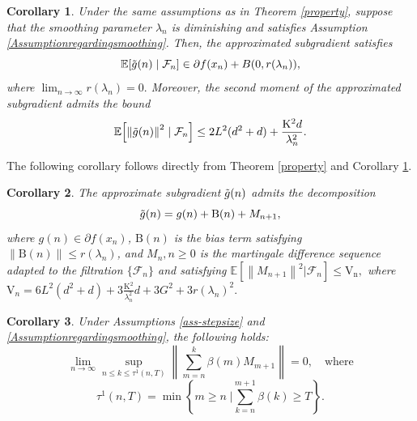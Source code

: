 \documentclass[9pt,journal,twoside,web]{ieeecolor}
\newtheorem{Corollary}{Corollary}
\newcommand{\norm}[1]{\left\lVert #1 \right\rVert}
\begin{document}
\begin{Corollary}
Under the same assumptions as in Theorem \ref{property}, suppose that the smoothing parameter $\lambda_n$ is diminishing and satisfies Assumption \ref{Assumptionregardingsmoothing}. Then, the approximated subgradient satisfies
\begin{equation}
    \mathbb{E}[\Tilde{g}(n)\mid \mathcal{F}_n]
    \in \partial f(x_n) + B(0,r(\lambda_n)),
    \label{expectationc}
\end{equation}
where $\lim_{n\to\infty} r(\lambda_n)=0.$
Moreover, the second moment of the approximated subgradient admits the bound
\begin{equation}
    \mathbb{E}\!\left[\norm{\Tilde{g}(n)}^2 \mid \mathcal{F}_n \right]
    \leq
    2L^2(d^2+d)
    +
    \frac{\mathrm{K}^2 d}{\lambda_n^2}.
    \label{variancec}
\end{equation}
\label{Corlloarydiminishinglambda}
\end{Corollary}




\color{black}



The following corollary follows directly from Theorem \ref{property} and Corollary \ref{Corlloarydiminishinglambda}.

\begin{Corollary}
    The approximate subgradient $\Tilde{g}(n)$ admits the decomposition
    \begin{equation*}
        \Tilde{g}(n) = g(n) + \mathrm{B} (n) + M_{n+1},
    \end{equation*}
    where $g(n) \in \partial f(x_n)$,  $\mathrm{B}(n)$ is the bias term satisfying $\norm{\mathrm{B}(n)} \leq r(\lambda_n)$, and $M_{n},n\geq 0$ is the martingale difference sequence adapted to the filtration $\{\mathcal{F}_n \}$ and satisfying $ \mathbb{E}[\norm{M_{n+1}}^2 | \mathcal{F}_n] \leq \mathrm{V_n},$ 
    where  $ \mathrm{V}_n = 6L^2 (d^2 +d) + 3 \frac{\mathrm{K}^2}{\lambda_n^2} d + 3 G^2 + 3 r(\lambda_n)^2.$
    \label{nosie decomposition}
\end{Corollary}

\begin{Corollary}
Under Assumptions \ref{ass-stepsize} and \ref{Assumptionregardingsmoothing}, the following holds:  
    \begin{equation*}
   \lim\limits_{n \to \infty} \sup\limits_{n \leq k \leq \tau^1(n,T)} \norm{\sum\limits_{m=n}^{k} \beta(m)  M_{m+1}} = 0, \quad \text{where}
\end{equation*}
 \begin{equation*}
        \tau^1(n,T) = \min \left\{ m \geq n \; | \sum\limits_{k=n}^{m+1}  \beta(k) \geq T \right\}.
    \end{equation*}
    \label{Corolloary assumption on noise}
\end{Corollary}
\end{document}
